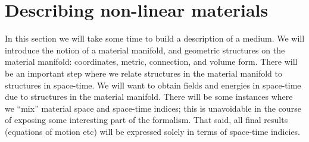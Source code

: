 %    
%    
%    
%    
%    
%    
%    
%    


\section{Describing non-linear materials}
In this section we will take some time to build a description of a medium. We will introduce the notion of a material manifold, and geometric structures on the material manifold: coordinates, metric, connection, and volume form. There will be an important step where we relate structures in the material manifold to structures in space-time. We will want to obtain fields and energies in space-time due to structures in the material manifold. There will be some instances where we ``mix'' material space and space-time indices; this is   unavoidable in the course of exposing some interesting part of the formalism. That said, all final results (equations of motion etc) will be expressed solely in terms of space-time indicies.

